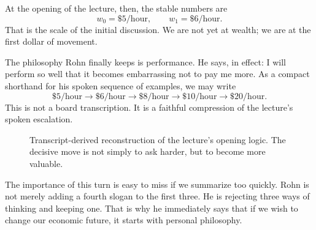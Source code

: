 At the opening of the lecture, then, the stable numbers are
\begin{equation}
w_0=\$5/\text{hour}, \qquad w_1=\$6/\text{hour}.
\end{equation}
That is the scale of the initial discussion. We are not yet at wealth; we are at the first dollar of movement.

The philosophy Rohn finally keeps is performance. He says, in effect: I will perform so well that it becomes embarrassing not to pay me more. As a compact shorthand for his spoken sequence of examples, we may write
\begin{equation}
\$5/\text{hour}\to \$6/\text{hour}\to \$8/\text{hour}\to \$10/\text{hour}\to \$20/\text{hour}.
\end{equation}
This is not a board transcription. It is a faithful compression of the lecture's spoken escalation.

\begin{figure}[t]
\centering
{}
\caption{Transcript-derived reconstruction of the lecture's opening logic. The decisive move is not simply to ask harder, but to become more valuable.}
\end{figure}

The importance of this turn is easy to miss if we summarize too quickly. Rohn is not merely adding a fourth slogan to the first three. He is rejecting three ways of thinking and keeping one. That is why he immediately says that if we wish to change our economic future, it starts with personal philosophy.

